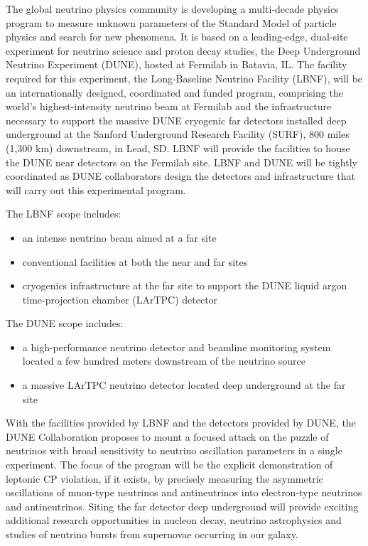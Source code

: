 

The global neutrino physics community is developing a multi-decade
physics program to measure unknown parameters of the Standard Model of
particle physics and search for new phenomena.  It is based on a
leading-edge, dual-site experiment
for neutrino science and proton decay studies, the Deep Underground
Neutrino Experiment (DUNE), hosted at Fermilab in Batavia, IL. The
facility required for this experiment, the Long-Baseline Neutrino
Facility (LBNF), will be an internationally designed, coordinated and
funded program, comprising the world's highest-intensity neutrino beam
at Fermilab and the infrastructure necessary to support the massive
DUNE cryogenic far detectors installed deep underground at the Sanford
Underground Research Facility (SURF), 800 miles (1,300 km) downstream,
in Lead, SD. LBNF will provide the facilities to house the DUNE near
detectors on the Fermilab site. LBNF and DUNE will be tightly
coordinated as DUNE collaborators design the detectors and
infrastructure that will carry out this experimental program.
  
The LBNF scope includes:
\begin{itemize}
\item an intense neutrino beam aimed at a far site
\item conventional facilities at both the near and far sites
\item cryogenics infrastructure at the far site to support the DUNE
  liquid argon time-projection chamber (LArTPC) detector
\end{itemize}

The DUNE scope includes:
\begin{itemize}
\item %
a high-performance neutrino detector and beamline monitoring system
located a few hundred meters downstream of the neutrino source
\item a massive LArTPC neutrino detector located deep underground at
  the far site
\end{itemize}

With the facilities provided by LBNF and the detectors
provided by DUNE, the DUNE Collaboration proposes to mount a focused
attack on the puzzle of neutrinos with broad sensitivity to neutrino
oscillation parameters in a single experiment.  The focus of the
program will be the explicit demonstration of leptonic CP violation,
if it exists, by precisely measuring the asymmetric oscillations of
muon-type neutrinos and antineutrinos into electron-type neutrinos and
antineutrinos.  Siting the far detector deep underground will provide
exciting additional research opportunities in nucleon decay, neutrino
astrophysics and studies of neutrino bursts from supernovae occurring
in our galaxy.
